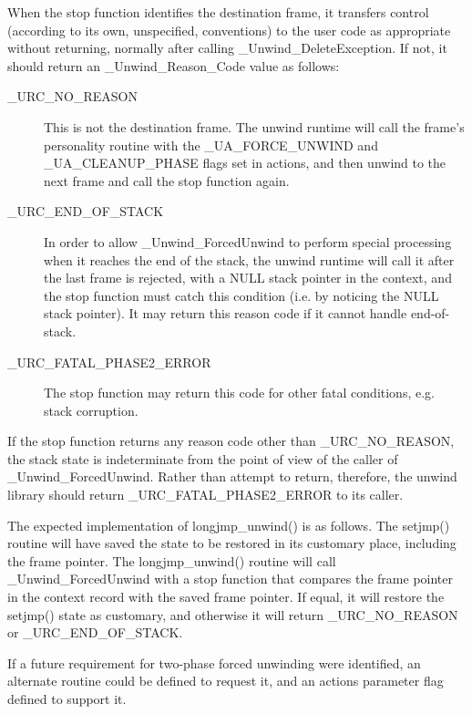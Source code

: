 When the stop function identifies the destination frame, it
transfers control (according to its own, unspecified, conventions)
to the user code as appropriate without returning, normally after
calling \_Unwind\_DeleteException. If not, it should return an
\_Unwind\_Reason\_Code value as follows:

\begin{description}
\item[\_URC\_NO\_REASON] 
     This is not the destination frame. The unwind 
     runtime will call the frame's personality routine with the
     \_UA\_FORCE\_UNWIND and \_UA\_CLEANUP\_PHASE flags set in actions, 
     and then unwind to the next frame and call the stop function again. 

\item[\_URC\_END\_OF\_STACK] In order to allow \_Unwind\_ForcedUnwind 
     to perform special processing when it reaches the end of the stack, 
     the unwind runtime will call it after the last frame is rejected, 
     with a NULL stack pointer in the context, and the stop function must 
     catch this condition (i.e. by noticing the NULL stack pointer). 
     It may return this reason code if it cannot handle end-of-stack. 

\item[\_URC\_FATAL\_PHASE2\_ERROR] The stop function may return this code 
     for other fatal conditions, e.g. stack corruption. 
\end{description}

If the stop function returns any reason code other than \_URC\_NO\_REASON, 
the stack state is indeterminate from the point of view of the caller of 
\_Unwind\_ForcedUnwind. Rather than attempt to return, therefore, 
the unwind library should return \_URC\_FATAL\_PHASE2\_ERROR to its caller. 


The expected implementation of longjmp\_unwind() is as follows.
The setjmp() routine will have saved the state to be restored in its
customary place, including the frame pointer. The longjmp\_unwind()
routine will call \_Unwind\_ForcedUnwind with a stop function that
compares the frame pointer in the context record with the saved frame
pointer. If equal, it will restore the setjmp() state as customary,
and otherwise it will return \_URC\_NO\_REASON or \_URC\_END\_OF\_STACK.

If a future requirement for two-phase forced unwinding were identified,
an alternate routine could be defined to request it, and an actions
parameter flag defined to support it.

